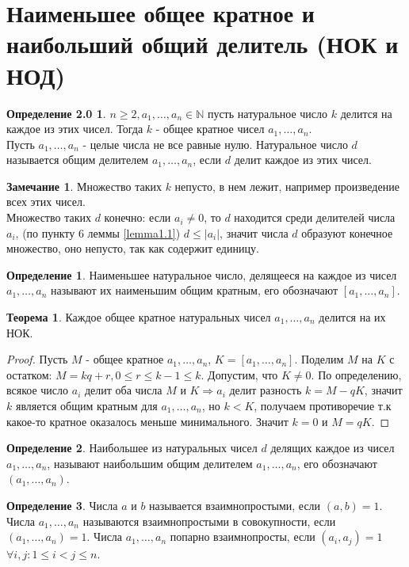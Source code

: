 \documentclass[a4paper, 12pt]{article}
\theoremstyle{definition}
\newtheorem{definition}{Определение}[section]
\newtheorem{theorem}{Теорема}[section]
\newtheorem*{comm}{Замечание}
\newtheorem*{def20}{Определение 2.0}
\begin{document}
    \section{Наименьшее общее кратное и наибольший общий делитель (НОК и НОД)}
    \begin{def20}
         $n\geq 2, a_1, \dots, a_n \in \mathbb{N}$ пусть натуральное число $k$ делится на каждое из этих чисел. Тогда $k$ - общее кратное чисел $a_1, \dots, a_n$. \\
        Пусть $a_1, \dots, a_n$ - целые числа не все равные нулю. Натуральное число $d$ называется общим делителем $a_1, \dots, a_n$, если $d$ делит каждое из этих чисел.
    \end{def20}
    \begin{comm}
        Множество таких $k$ непусто, в нем лежит, например произведение всех этих чисел. \\ Множество таких $d$ конечно: если $a_i\ne 0$, то $d$ находится среди делителей числа $a_i$, (по пункту 6 леммы \ref{lemma1.1}) $d\leq |a_i|$, значит числа $d$ образуют конечное множество, оно непусто, так как содержит единицу.
    \end{comm}
    \begin{definition}
        Наименьшее натуральное число, делящееся на каждое из чисел $a_1, \dots, a_n$ называют их наименьшим общим кратным, его обозначают $[a_1, \dots, a_n]$.
    \end{definition}
    \begin{theorem} \label{th2.1}
        Каждое общее кратное натуральных чисел $a_1, \dots, a_n$ делится на их НОК.
    \end{theorem}
    \begin{proof}
        Пусть $M$ - общее кратное $a_1, \dots, a_n$, $K=[a_1, \dots, a_n]$. Поделим $M$ на $K$ с остатком: $M=kq+r, 0\leq r\leq k-1\leq k$. Допустим, что $K\ne 0$. По определению, всякое число $a_i$ делит оба числа $M$ и $K \Rightarrow a_i$ делит разность $k=M-qK$, значит $k$ является общим кратным для $a_1, \dots, a_n$, но $k<K$, получаем противоречие т.к какое-то кратное оказалось меньше минимального. Значит $k=0$ и $M=qK$.  
    \end{proof}
    \begin{definition}
        Наибольшее из натуральных чисел $d$ делящих каждое из чисел $a_1, \dots, a_n$, называют наибольшим общим делителем $a_1, \dots, a_n$, его обозначают $(a_1, \dots, a_n)$.
    \end{definition}
    \begin{definition}
        Числа $a$ и $b$ называется взаимнопростыми, если $(a,b)=1$. Числа $a_1, \dots, a_n$ называются взаимнопростыми в совокупности, если \\ $(a_1, \dots, a_n)=1$. Числа $a_1, \dots, a_n$ попарно взаимнопросты, если $(a_i,a_j)=1$ $\forall i,j: 1\leq i<j\leq n$.
    \end{definition}
\end{document}
